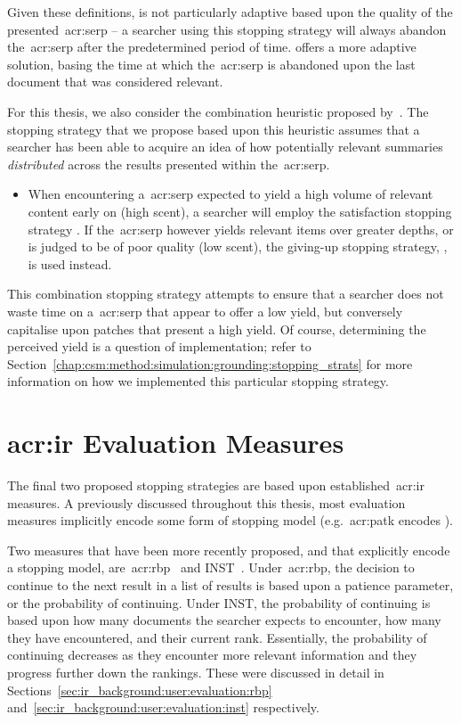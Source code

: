 Given these definitions,  is not particularly adaptive based upon the quality of the presented~\gls{acr:serp} -- a searcher using this stopping strategy will always abandon the~\gls{acr:serp} after the predetermined period of time.  offers a more adaptive solution, basing the time at which the~\gls{acr:serp} is abandoned upon the last document that was considered relevant.

For this thesis, we also consider the combination heuristic proposed by~\cite{mcnair1982gut_mvt}. The stopping strategy that we propose based upon this heuristic assumes that a searcher has been able to acquire an idea of how potentially relevant summaries \emph{distributed} across the results presented within the~\gls{acr:serp}.

\begin{itemize}
    \item{ When encountering a~\gls{acr:serp} expected to yield a high volume of relevant content early on (high scent), a searcher will employ the satisfaction stopping strategy . If the~\gls{acr:serp} however yields relevant items over greater depths, or is judged to be of poor quality (low scent), the giving-up stopping strategy, , is used instead.}
\end{itemize}

This combination stopping strategy attempts to ensure that a searcher does not waste time on a~\gls{acr:serp} that appear to offer a low yield, but conversely capitalise upon patches that present a high yield. Of course, determining the perceived yield is a question of implementation; refer to Section~\ref{chap:csm:method:simulation:grounding:stopping_strats} for more information on how we implemented this particular stopping strategy.

\section{\gls{acr:ir} Evaluation Measures}
The final two proposed stopping strategies are based upon established~\gls{acr:ir} measures. A previously discussed throughout this thesis, most evaluation measures implicitly encode some form of stopping model (e.g.~\gls{acr:patk} encodes ).

Two measures that have been more recently proposed, and that explicitly encode a stopping model, are~\gls{acr:rbp}~\citep{moffat2008rbp} and INST~\citep{bailey2015inst, moffat2015inst}. Under~\gls{acr:rbp}, the decision to continue to the next result in a list of results is based upon a patience parameter, or the probability of continuing. Under INST, the probability of continuing is based upon how many documents the searcher expects to encounter, how many they have encountered, and their current rank. Essentially, the probability of continuing decreases as they encounter more relevant information and they progress further down the rankings. These were discussed in detail in Sections~\ref{sec:ir_background:user:evaluation:rbp} and~\ref{sec:ir_background:user:evaluation:inst} respectively.

